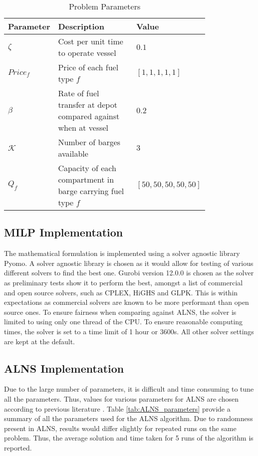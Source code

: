 \begin{table}[h]
    \centering
    \begin{tabular}{>{\raggedright}p{0.2\linewidth} p{0.4\linewidth} p{0.2\linewidth}}
        \toprule
        \textbf{Parameter} & \textbf{Description} &\textbf{Value}\\ 
        \midrule
        $\zeta$ & Cost per unit time to operate vessel & $0.1$\\ 
        
        $Price_{f}$ & Price of each fuel type $f$ & $[1,1,1,1,1]$\\ 
         
        $\beta$ & Rate of fuel transfer at depot compared against when at vessel & $0.2$ \\ 
                             
		
		$\mathcal{K}$ & Number of barges available & $3$\\
				
		$Q_{f}$ & Capacity of each compartment in barge carrying fuel type $f$ & $[50,50,50,50,50]$\\
        \bottomrule
    \end{tabular}
    \caption{Problem Parameters}
    \label{tab:Problem_parameters}
\end{table}

\subsection{MILP Implementation}
The mathematical formulation is implemented using a solver agnostic library Pyomo. A solver agnostic library is chosen as it would allow for testing of various different solvers to find the best one.
Gurobi version 12.0.0 is chosen as the solver as preliminary tests show it to perform the best, amongst a list of commercial and open source solvers, such as CPLEX, HiGHS and GLPK. This is within expectations as commercial solvers are known to be more performant than open source ones.
To ensure fairness when comparing against ALNS, the solver is limited to using only one thread of the CPU. To ensure reasonable computing times, the solver is set to a time limit of 1 hour or 3600s. All other solver settings are kept at the default.

\subsection{ALNS Implementation}
Due to the large number of parameters, it is difficult and time consuming to tune all the parameters. Thus, values for various parameters for ALNS are chosen according to previous literature \cite{yu_adaptive_2024}. Table \ref{tab:ALNS_parameters} provide a summary of all the parameters used for the ALNS algorithm. Due to randomness present in ALNS, results would differ slightly for repeated runs on the same problem. Thus, the average solution and time taken for 5 runs of the algorithm is reported.

